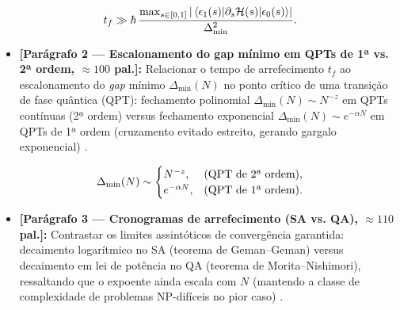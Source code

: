 \documentclass[aps,pre,twocolumn,10pt,superscriptaddress,nofootinbib]{revtex4-2}
\begin{document}
\begin{equation}
  t_f \gg \hbar \, \frac{\max_{s \in [0,1]} \abs{\mel{\epsilon_1(s)}{\partial_s \mathcal{H}(s)}{\epsilon_0(s)}}}{\Delta_{\min}^2}.
  \label{eq:adiabatica}
\end{equation}

\begin{itemize}
  \item \textbf{[Parágrafo 2 --- Escalonamento do gap mínimo em QPTs de 1ª vs. 2ª ordem, $\approx 100$ pal.]:}
        Relacionar o tempo de arrefecimento $t_f$ ao escalonamento do \emph{gap} mínimo $\Delta_{\min}(N)$ no ponto crítico de uma transição de fase quântica (QPT): fechamento polinomial $\Delta_{\min}(N) \sim N^{-z}$ em QPTs contínuas (2ª ordem) versus fechamento exponencial $\Delta_{\min}(N) \sim e^{-\alpha N}$ em QPTs de 1ª ordem (cruzamento evitado estreito, gerando gargalo exponencial) \cite{Albash2018,Chakrabarti2022}.
\end{itemize}

\begin{equation}
  \Delta_{\min}(N) \sim
  \begin{cases}
    N^{-z}, & \text{(QPT de 2\textordfeminine{} ordem)}, \\
    e^{-\alpha N}, & \text{(QPT de 1\textordfeminine{} ordem)}.
  \end{cases}
  \label{eq:gap_scaling}
\end{equation}

\begin{itemize}
  \item \textbf{[Parágrafo 3 --- Cronogramas de arrefecimento (SA vs. QA), $\approx 110$ pal.]:}
        Contrastar os limites assintóticos de convergência garantida: decaimento logarítmico no SA (teorema de Geman--Geman) versus decaimento em lei de potência no QA (teorema de Morita--Nishimori), ressaltando que o expoente ainda escala com $N$ (mantendo a classe de complexidade de problemas NP-difíceis no pior caso) \cite{Kadowaki1998,Das2008}.
\end{itemize}
\end{document}

